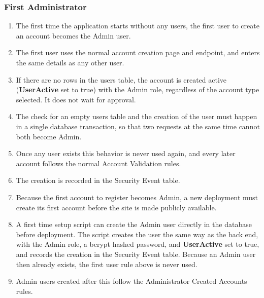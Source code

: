     \subsubsection{First Administrator}
        \begin{enumerate}[leftmargin=3\parindent]
            \item The first time the application starts without any users, the first user to create an account becomes the Admin user.
            \item The first user uses the normal account creation page and endpoint, and enters the same details as any other user.
            \item If there are no rows in the users table, the account is created active (\textbf{UserActive} set to true) with the Admin role, regardless of the account type selected. It does not wait for approval.
            \item The check for an empty users table and the creation of the user must happen in a single database transaction, so that two requests at the same time cannot both become Admin.
            \item Once any user exists this behavior is never used again, and every later account follows the normal Account Validation rules.
            \item The creation is recorded in the Security Event table.
            \item Because the first account to register becomes Admin, a new deployment must create its first account before the site is made publicly available.
            \item A first time setup script can create the Admin user directly in the database before deployment. The script creates the user the same way as the back end, with the Admin role, a bcrypt hashed password, and \textbf{UserActive} set to true, and records the creation in the Security Event table. Because an Admin user then already exists, the first user rule above is never used.
            \item Admin users created after this follow the Administrator Created Accounts rules.
        \end{enumerate}
